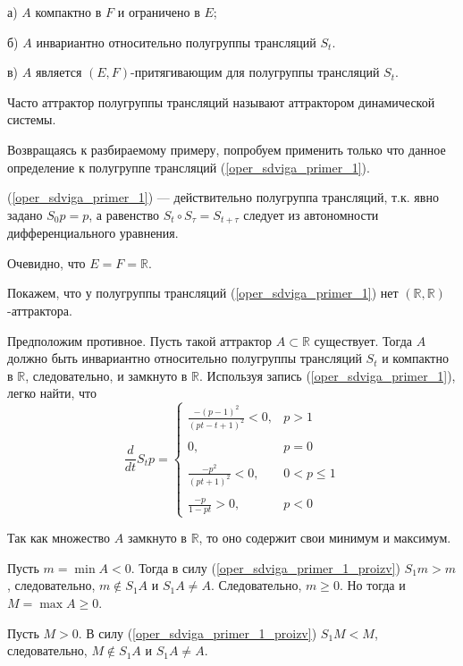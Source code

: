 а) $A$ компактно в $F$ и ограничено в $E$;

б) $A$ инвариантно относительно полугруппы трансляций $S_t$.

в) $A$ является $(E,F)$-притягивающим для полугруппы трансляций $S_t$.

Часто аттрактор полугруппы трансляций называют аттрактором динамической системы.

Возвращаясь к разбираемому примеру, попробуем применить только что данное определение к полугруппе трансляций (\ref{oper_sdviga_primer_1}).

(\ref{oper_sdviga_primer_1}) --- действительно полугруппа трансляций, т.к. явно задано $S_0 p = p$, а равенство $S_t \circ S_\tau = S_{t+\tau}$ следует из автономности дифференциального уравнения.

Очевидно, что $E=F=\mathbb{R}$.

Покажем, что у полугруппы трансляций (\ref{oper_sdviga_primer_1}) нет $(\mathbb{R},\mathbb{R})$-аттрактора.

Предположим противное.
Пусть такой аттрактор $A \subset \mathbb{R}$ существует.
Тогда $A$ должно быть инвариантно относительно полугруппы трансляций $S_t$ и компактно в $\mathbb{R}$, следовательно, и замкнуто в $\mathbb{R}$.
Используя запись (\ref{oper_sdviga_primer_1}), легко найти, что
\begin{equation}\label{oper_sdviga_primer_1_proizv}
	\frac{d}{dt}S_t p =
	\left\{
		\begin{array}{ll}
			\frac{-(p-1)^2}{(pt-t+1)^2} < 0, & p > 1
		\\\\
			0,        & p = 0
		\\\\
			\frac{-p^2}{(pt+1)^2} < 0,        & 0 < p \leq 1
		\\\\
			\frac{-p}{1 - pt} > 0,      & p < 0
		\end{array}
	\right.
\end{equation}

Так как множество $A$ замкнуто в $\mathbb{R}$, то оно содержит свои минимум и максимум.

Пусть $m = \min A < 0$.
Тогда в силу (\ref{oper_sdviga_primer_1_proizv}) $S_1 m > m$, следовательно, $m \notin S_1 A$ и $S_1 A \neq A$.
Следовательно, $m \geq 0$.
Но тогда и $M = \max A \geq 0$.

Пусть $M > 0$.
В силу (\ref{oper_sdviga_primer_1_proizv}) $S_1 M < M$, следовательно, $M \notin S_1 A$ и $S_1 A \neq A$.

